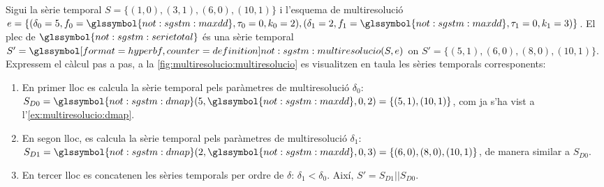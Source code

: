 \begin{example}
  Sigui la sèrie temporal $S=\{(1,0),(3,1),(6,0),(10,1)\}$ i l'esquema
  de multiresolució
  $e=\{(\delta_0=5,f_0=\glssymbol{not:sgstm:maxdd},\tau_0=0,k_0=2),
  (\delta_1=2,f_1=\glssymbol{not:sgstm:maxdd},\tau_1=0,k_1=3)\}$.
  El plec de $\glssymbol{not:sgstm:serietotal}$ és una sèrie temporal
  $S'= \glssymboldef{not:sgstm:multiresolucio}(S,e)$ on
  $S'=\{(5,1),(6,0),(8,0),(10,1)\}$. Expressem el càlcul pas a pas, a la
  \autoref{fig:multiresolucio:multiresolucio} es visualitzen en taula les sèries
  temporals corresponents:

  \begin{enumerate}
  \item En primer lloc es calcula la sèrie temporal pels paràmetres de
    multiresolució $\delta_0$:
    $S_{D0}=\glssymbol{not:sgstm:dmap}(5,\glssymbol{not:sgstm:maxdd},0,2)=\{(5,1),(10,1)\}$,
    com ja s'ha vist a l'\autoref{ex:multiresolucio:dmap}.

  \item En segon lloc, es calcula la sèrie temporal pels paràmetres de
    multiresolució $\delta_1$:
    $S_{D1}=\glssymbol{not:sgstm:dmap}(2,\glssymbol{not:sgstm:maxdd},0,3)=\{(6,0),(8,0),(10,1)\}$,
    de manera similar a $S_{D0}$.

  \item En tercer lloc es concatenen les sèries temporals per ordre de
    $\delta$: $\delta_1<\delta_0$. Així, $S'= S_{D1} || S_{D0}$.

  \end{enumerate}
  



\end{example}
